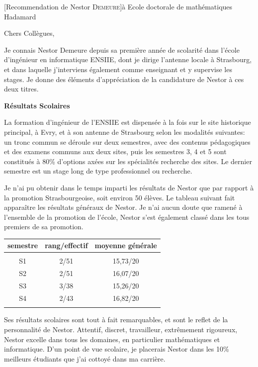 \documentclass[a4paper,10pt]{article}
\begin{document}

\begin{letter}[Recommendation de Nestor \textsc{Demeure}]{à}%
{Ecole doctorale de mathématiques Hadamard}


Chers Collègues,

Je  connais Nestor Demeure  depuis sa  première année  de  scolarité dans  l'école
d'ingénieur  en  informatique   ENSIIE,  dont  je  dirige   l'antenne  locale  à
Strasbourg, et dans laquelle j'interviens également comme enseignant et y
supervise les stages.
Je donne des éléments d'appréciation de la candidature de Nestor à ces deux titres.

\textbf{Résultats Scolaires}

La formation d'ingénieur de l'ENSIIE est dispensée à la fois sur le site
historique principal, à Evry, et à son antenne de Strasbourg selon les modalités
suivantes: un tronc commun se déroule sur deux semestres, avec des contenus 
pédagogiques et des examens communs aux deux sites, puis les semestres 3, 4 et 5
sont constitués à 80\% d'options axées sur les spécialités recherche des sites.
Le dernier semestre est un stage long de type professionnel ou recherche. 

Je n'ai pu obtenir dans le temps imparti les résultats de Nestor que par rapport
à la promotion Strasbourgeoise, soit environ  50 élèves. Le tableau suivant fait
apparaître  les résultats généraux de Nestor. Je n'ai aucun doute que ramené à
l'ensemble de la promotion de l'école, Nestor s'est également classé dans les
tous premiers de sa promotion.

\begin{center}
\begin{tabular}{ccc}
semestre & rang/effectif & moyenne générale\\
\hline \\
S1 & 2/51 & 15,73/20\\
S2 & 2/51 & 16,07/20\\
S3 & 3/38 & 15,26/20\\
S4 & 2/43 & 16,82/20\\
\hline \\
\end{tabular}
\end{center}

Ses résultats scolaires sont  tout à fait remarquables, et sont  le reflet de la
personnalité de  Nestor. Attentif, discret, travailleur,  extrêmement rigoureux,
Nestor  excelle  dans  tous  les   domaines,  en  particulier  mathématiques  et
informatique.  D'un point  de vue  scolaire, je  placerais Nestor  dans les  10\%
meilleurs étudiants que j'ai cottoyé dans ma carrière.
  


\end{letter}
\end{document}
